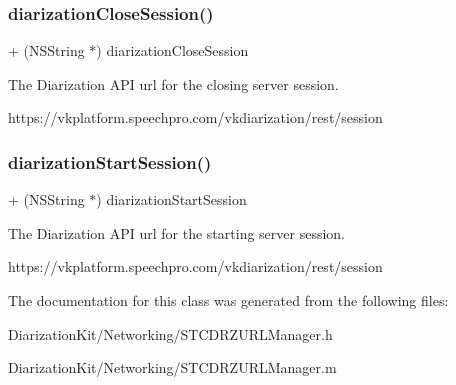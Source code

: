 \subsubsection{\texorpdfstring{diarization\+Close\+Session()}{diarizationCloseSession()}}
{\footnotesize\ttfamily + (N\+S\+String $\ast$) diarization\+Close\+Session \begin{DoxyParamCaption}{ }\end{DoxyParamCaption}}

The Diarization A\+PI url for the closing server session. 
\begin{DoxyCode}
https:\textcolor{comment}{//vkplatform.speechpro.com/vkdiarization/rest/session}
\end{DoxyCode}
 \hypertarget{interface_s_t_c_d_r_z_u_r_l_manager_a038ae99fc8452709c8a673a4a640250b}{}\label{interface_s_t_c_d_r_z_u_r_l_manager_a038ae99fc8452709c8a673a4a640250b} 
\subsubsection{\texorpdfstring{diarization\+Start\+Session()}{diarizationStartSession()}}
{\footnotesize\ttfamily + (N\+S\+String $\ast$) diarization\+Start\+Session \begin{DoxyParamCaption}{ }\end{DoxyParamCaption}}

The Diarization A\+PI url for the starting server session. 
\begin{DoxyCode}
https:\textcolor{comment}{//vkplatform.speechpro.com/vkdiarization/rest/session}
\end{DoxyCode}
 

The documentation for this class was generated from the following files\+:\begin{DoxyCompactItemize}
\item 
Diarization\+Kit/\+Networking/S\+T\+C\+D\+R\+Z\+U\+R\+L\+Manager.\+h\item 
Diarization\+Kit/\+Networking/S\+T\+C\+D\+R\+Z\+U\+R\+L\+Manager.\+m\end{DoxyCompactItemize}
